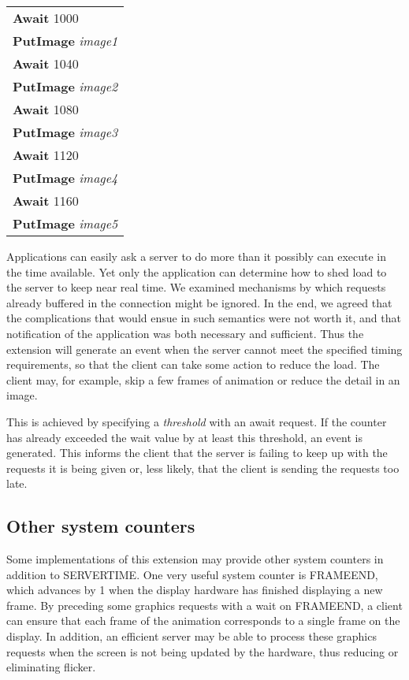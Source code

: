 \begin{center}
\begin{tabular}{l}
	{\bf Await} 1000\\
	{\bf PutImage} {\it image1}\\
	{\bf Await} 1040\\
	{\bf PutImage} {\it image2}\\
	{\bf Await} 1080\\
	{\bf PutImage} {\it image3}\\
	{\bf Await} 1120\\
	{\bf PutImage} {\it image4}\\
	{\bf Await} 1160\\
	{\bf PutImage} {\it image5}\\
\end{tabular}
\end{center}

Applications can easily ask a server to do more than it possibly can execute
in the time available.  Yet only the application can determine how to shed
load to the server to keep near real time.  We examined mechanisms by which
requests already buffered in the connection might be ignored. In the end, we
agreed that the complications that would ensue in such semantics were not
worth it, and that notification of the application was both necessary and
sufficient. Thus the extension will generate an event when the server cannot
meet the specified timing requirements, so that the client can take some
action to reduce the load. The client may, for example, skip a few frames of
animation or reduce the detail in an image.

This is achieved by specifying a {\it threshold} with an await request. If the
counter has already exceeded the wait value by at least this threshold, an
event is generated. This informs the client that the server is failing to keep
up with the requests it is being given or, less likely, that the client is
sending the requests too late.

\subsection*{Other system counters}

Some implementations of this extension may provide other system counters in
addition to SERVERTIME. One very useful system counter is FRAMEEND, which
advances by 1 when the display hardware has finished displaying a new frame.
By preceding some graphics requests with a wait on FRAMEEND, a client can
ensure that each frame of the animation corresponds to a single frame on the
display. In addition, an efficient server may be able to process these
graphics requests when the screen is not being updated by the hardware, thus
reducing or eliminating flicker.

